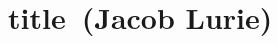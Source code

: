 \renewcommand{\thespeaker}{Jacob Lurie}
\renewcommand{\thetitle}{title}
\section{\thetitle~(\thespeaker)}
